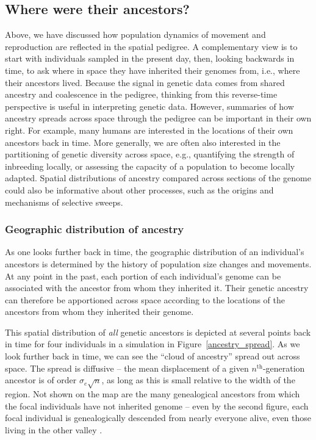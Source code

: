 \documentclass{ar-1col}
\renewcommand{\emph}[1]{{\textit{#1}}}
\begin{document}
\subsection{Where were their ancestors?}

Above, we have discussed how population dynamics of movement and reproduction
are reflected in the spatial pedigree.
A complementary view is to
start with individuals sampled in the present day,
then, looking backwards in time,
to ask where in space they have inherited their genomes from, 
i.e., where their ancestors lived.
Because the signal in genetic data comes from 
shared ancestry and coalescence in the pedigree,
thinking from this reverse-time perspective 
is useful in interpreting genetic data.
However, summaries of how ancestry spreads across space 
through the pedigree can be important in their own right.
For example, many humans are interested
in the locations of their own ancestors back in time.
More generally,
we are often also interested in the partitioning of genetic diversity across space,
e.g.,
quantifying the strength of inbreeding locally,
or assessing the capacity of a population to become locally adapted.
Spatial distributions of ancestry compared across sections of the genome
could also be informative about 
other processes, such as
the origins and mechanisms of selective sweeps.


\subsubsection{Geographic distribution of ancestry}

As one looks further back in time,
the geographic distribution of an individual's ancestors
is determined by the history of population size changes and movements.
At any point in the past,
each portion of each individual's genome can be associated 
with the ancestor from whom they inherited it.
Their genetic ancestry can therefore be apportioned across space according
to the locations of the ancestors from whom they inherited their genome.

This spatial distribution of \emph{all} genetic ancestors is depicted 
at several points back in time
for four individuals in a simulation in Figure~\ref{ancestry_spread}.
As we look further back in time,
we can see the ``cloud of ancestry'' spread out across space.
The spread is diffusive --
the mean displacement of a given $n^\text{th}$-generation ancestor 
is of order $\sigma_e \sqrt{n}$,
as long as this is small relative to the width of the region.
Not shown on the map are the many genealogical ancestors
from which the focal individuals have not inherited genome --
even by the second figure,
each focal individual is genealogically descended from nearly everyone alive,
even those living in the other valley \citep{chang1999}.
\end{document}
